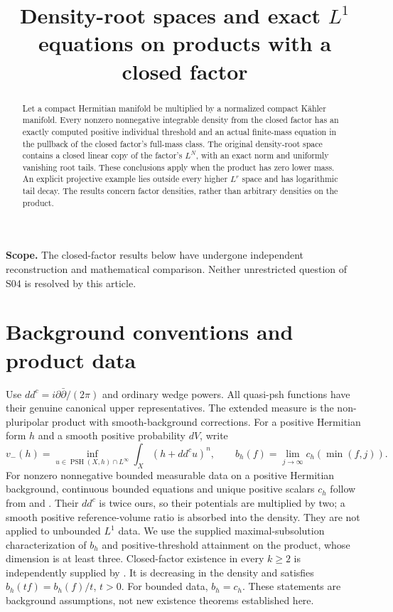 \documentclass[11pt]{article}
\title{Density-root spaces and exact $L^1$ equations\newline
on products with a closed factor}
\author{}\date{}
\newcommand{\ddc}{dd^c}
\newcommand{\PSH}{\operatorname{PSH}}
\theoremstyle{remark}\newtheorem{remark}[theorem]{Remark}
\begin{document}
\maketitle
\noindent\textbf{Scope.} The closed-factor results below have undergone
independent reconstruction and mathematical comparison. Neither
unrestricted question of S04 is resolved by this article.
\begin{abstract}
Let a compact Hermitian manifold be multiplied by a normalized compact
K\"ahler manifold. Every nonzero nonnegative integrable density from the closed
factor has an exactly computed positive individual threshold and an
actual finite-mass equation in the pullback of the closed factor's
full-mass class. The original density-root space contains a closed
linear copy of the factor's $L^N$, with an exact norm and uniformly
vanishing root tails. These conclusions apply when the product has
zero lower mass. An explicit projective example lies outside every
higher $L^r$ space and has logarithmic tail decay. The results concern
factor densities, rather than arbitrary densities on the product.
\end{abstract}

\section{Background conventions and product data}
Use $\ddc=i\partial\bar\partial/(2\pi)$ and ordinary wedge powers.
All quasi-psh functions have their genuine canonical upper
representatives. The extended measure is the non-pluripolar product
with smooth-background corrections. For a positive Hermitian form $h$
and a smooth positive probability $dV$, write
\[
 v_-(h)=\inf_{u\in\PSH(X,h)\cap L^\infty}\int_X(h+\ddc u)^n,
 \qquad b_h(f)=\lim_{j\to\infty}c_h(\min(f,j)).
\]
For nonzero nonnegative bounded measurable data on a positive Hermitian
background, continuous bounded equations and unique positive scalars
$c_h$ follow from \cite[Theorem 0.1]{KN} and
\cite[Corollary 0.2]{Ng}. Their $\ddc$ is twice ours, so their
potentials are multiplied by two; a smooth positive reference-volume
ratio is absorbed into the density. They are not applied to unbounded
$L^1$ data. We use the supplied maximal-subsolution characterization
of $b_h$ and positive-threshold attainment on the product, whose
dimension is at least three. Closed-factor existence in every $k\geq2$
is independently supplied by \cite[Theorem A, Theorem 4.6]{GZ}.
It is decreasing in the density and satisfies
$b_h(tf)=b_h(f)/t$, $t>0$. For bounded data, $b_h=c_h$.
These statements are background assumptions, not new existence
theorems established here.
\end{document}
